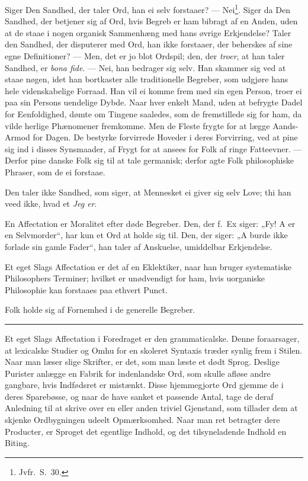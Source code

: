 \documentclass[12pt]{article}
\newcommand{\opage}[1]{\marginnote{\footnotesize\textit{[#1]}}}
\newcommand{\ombreak}{\par\medskip\begin{center}\rule{0.32\textwidth}{0.4pt}\end{center}\medskip}
\begin{document}
Siger Den Sandhed, der taler Ord, han ei selv forstaaer? --- Nei\footnote{Jvfr.\ S.\ 30.}. Siger da Den Sandhed, der betjener sig af Ord, hvis Begreb er ham bibragt af en Anden, uden at de staae i nogen organisk Sammenhæng med hans øvrige Erkjendelse? Taler den Sandhed, der disputerer med Ord, han ikke forstaaer, der beherskes af sine egne Definitioner? --- Men, det er jo blot \opage{185}Ordspil; den, der \emph{troer}, at han taler Sandhed, er \textit{bona fide}. --- Nei, han bedrager sig selv. Han skammer sig ved at staae nøgen, idet han bortkaster alle traditionelle Begreber, som udgjøre hans hele videnskabelige Forraad. Han vil ei komme frem med sin egen Person, troer ei paa sin Persons uendelige Dybde. Naar hver enkelt Mand, uden at befrygte Dadel for Eenfoldighed, dømte om Tingene saaledes, som de fremstillede sig for ham, da vilde herlige Phænomener fremkomme. Men de Fleste frygte for at lægge Aands-Armod for Dagen. De bestyrke forvirrede Hoveder i deres Forvirring, ved at pine sig ind i disses Synsmaader, af Frygt for at ansees for Folk af ringe Fatteevner. --- Derfor pine danske Folk sig til at tale germanisk; derfor agte Folk philosophiske Phraser, som de ei forstaae.

Den taler ikke Sandhed, som siger, at Mennesket ei giver sig selv Love; thi han veed ikke, hvad et \emph{Jeg er}.

En Affectation er Moralitet efter døde Begreber. Den, der f.\ Ex siger: „Fy! A er en Selvmorder``, har kun et Ord at holde sig til. Den, der siger: „A burde ikke forlade sin gamle Fader``, han taler af Anskuelse, umiddelbar Erkjendelse.

Et eget Slags Affectation er det af en Eklektiker, naar han bruger systematiske Philosophers Terminer; hvilket er unødvendigt for ham, hvis uorganiske Philosophie kan forstaaes paa ethvert Punct.

Folk holde sig af Fornemhed i de generelle Begreber.

\ombreak

Et eget Slags Affectation i Foredraget er den grammaticalske. Denne foraarsager, at lexicalske Studier og Omhu for \opage{186}en skoleret Syntaxis træder synlig frem i Stilen. Naar man læser slige Skrifter, er det, som man læste et dødt Sprog. Deslige Purister anlægge en Fabrik for indenlandske Ord, som skulle afløse andre gangbare, hvis Indfødsret er mistænkt. Disse hjemmegjorte Ord gjemme de i deres Sparebøsse, og naar de have sanket et passende Antal, tage de deraf Anledning til at skrive over en eller anden triviel Gjenstand, som tillader dem at skjenke Ordbygningen udeelt Opmærksomhed. Naar man ret betragter dere Producter, er Sproget det egentlige Indhold, og det tilsyneladende Indhold en Biting.
\end{document}
